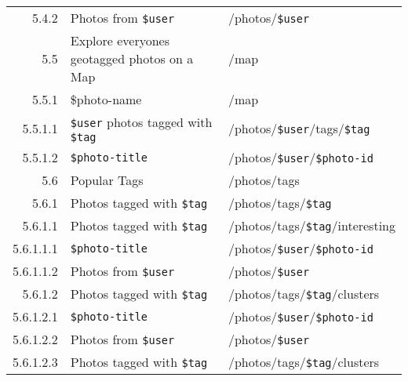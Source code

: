 \documentclass[11pt,a4paper]{article}
\newcommand{\var}[1]{\texttt{\${#1}}}
\begin{document}
\begin{center}
\begin{small}
\begin{longtable}{rp{5cm}l}
          5.4.2 &
          Photos from \var{user} &
          /photos/\var{user} \\

        5.5 &
        Explore everyones geotagged photos on a Map &
        /map \\

          5.5.1 &
          \$photo-name &
          /map \\

            5.5.1.1 &
            \var{user} photos tagged with \var{tag} &
            /photos/\var{user}/tags/\var{tag} \\

            5.5.1.2 &
            \var{photo-title} &
            /photos/\var{user}/\var{photo-id} \\

        5.6 &
        Popular Tags &
        /photos/tags \\

          5.6.1 &
          Photos tagged with \var{tag} &
          /photos/tags/\var{tag} \\

            5.6.1.1 &
            Photos tagged with \var{tag} &
            /photos/tags/\var{tag}/interesting \\

              5.6.1.1.1 &
              \var{photo-title} &
              /photos/\var{user}/\var{photo-id} \\

              5.6.1.1.2 &
              Photos from \var{user} &
              /photos/\var{user} \\

            5.6.1.2 &
            Photos tagged with \var{tag} &
            /photos/tags/\var{tag}/clusters \\

              5.6.1.2.1 &
              \var{photo-title} &
              /photos/\var{user}/\var{photo-id} \\

              5.6.1.2.2 &
              Photos from \var{user} &
              /photos/\var{user} \\

              5.6.1.2.3 &
              Photos tagged with \var{tag} &
              /photos/tags/\var{tag}/clusters \\




    \end{longtable}
  \end{small}
\end{center}
\end{document}
